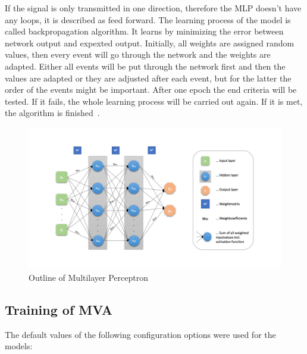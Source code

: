 \documentclass[11pt]{scrartcl}
\begin{document}
	If the signal is only transmitted in one direction, therefore the MLP doesn't have any loops, it is described as feed forward. The learning process of the model is called backpropagation algorithm. It learns by minimizing the error between network output and expexted output. Initially, all weights are assigned random values, then every event will go through the network and the weights are adapted. Either all events will be put through the network first and then the values are adapted or they are adjusted after each event, but for the latter the order of the events might be important. After one epoch the end criteria will be tested. If it fails, the whole learning process will be carried out again. If it is met, the algorithm is finished~\cite{MLP09}.
	
\begin{figure}[H]
	\begin{center}
	\includegraphics[width=1\textwidth]{figures/MLP.png}
	\caption{Outline of Multilayer Perceptron}
	\label{fig:MLP}
	\end{center}
\end{figure}

	\subsection{Training of MVA}
	
	The default values of the following configuration options were used for the models:
	
\end{document}
